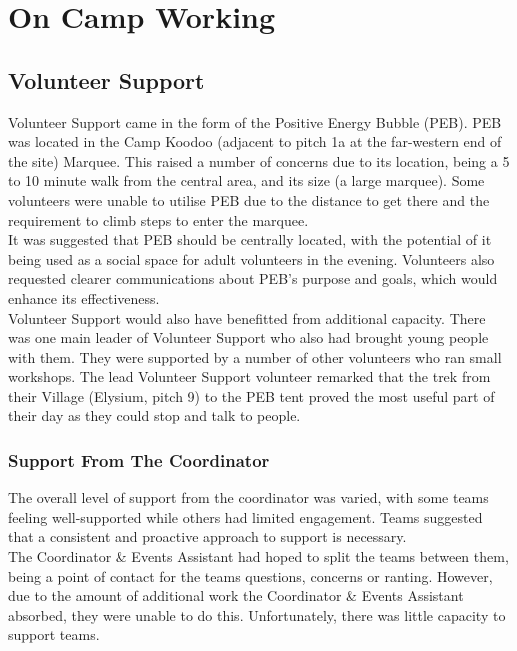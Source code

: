 \chapter{On Camp Working}
\section{Volunteer Support}
Volunteer Support came in the form of the Positive Energy Bubble (PEB). PEB was located in the Camp Koodoo (adjacent to pitch 1a at the far-western end of the site) Marquee. This raised a number of concerns due to its location, being a 5 to 10 minute walk from the central area, and its size (a large marquee). Some volunteers were unable to utilise PEB due to the distance to get there and the requirement to climb steps to enter the marquee. \\

It was suggested that PEB should be centrally located, with the potential of it being used as a social space for adult volunteers in the evening. Volunteers also requested clearer communications about PEB's purpose and goals, which would enhance its effectiveness. \\

Volunteer Support would also have benefitted from additional capacity. There was one main leader of Volunteer Support who also had brought young people with them. They were supported by a number of other volunteers who ran small workshops. The lead Volunteer Support volunteer remarked that the trek from their Village (Elysium, pitch 9) to the PEB tent proved the most useful part of their day as they could stop and talk to people. 

\subsection{Support From The Coordinator}
The overall level of support from the coordinator was varied, with some teams feeling well-supported while others had limited engagement. Teams suggested that a consistent and proactive approach to support is necessary. \\

The Coordinator \& Events Assistant had hoped to split the teams between them, being a point of contact for the teams questions, concerns or ranting. However, due to the amount of additional work the Coordinator \& Events Assistant absorbed, they were unable to do this. Unfortunately, there was little capacity to support teams.

